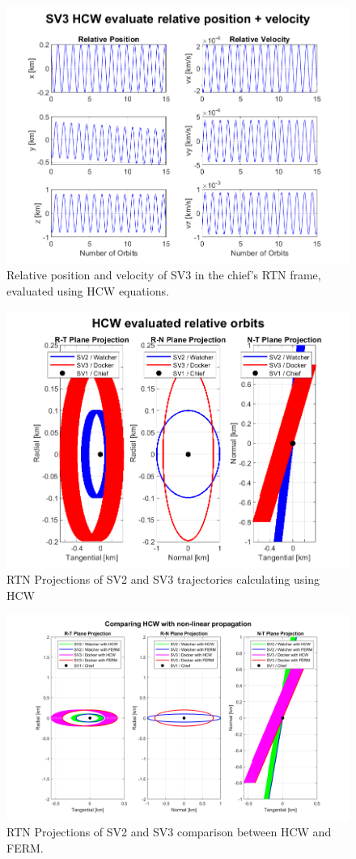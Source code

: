\begin{figure}[htpb]
    \centering
    \includegraphics[width=0.7\linewidth]{sim/figures/PS3/HCW_pos_vel_SV3.png}
    \caption{Relative position and velocity of SV3 in the chief's RTN frame, evaluated using HCW equations.}
    \label{fig:hcw_sv2_pos_vel}
\end{figure}

\begin{figure}[htpb]
    \centering
    \includegraphics[width=0.7\linewidth]{sim/figures/PS3/RTN_projections_HCW.png}
    \caption{RTN Projections of SV2 and SV3 trajectories calculating using HCW}
    \label{fig:hcw_projections}
\end{figure}

\begin{figure}[htpb]
    \centering
    \includegraphics[width=0.7\linewidth]{sim/figures/PS3/RTN_projections_HCW_comparison.png}
    \caption{RTN Projections of SV2 and SV3 comparison between HCW and FERM.}
    \label{fig:hcw_comparisons_projections}
\end{figure}

